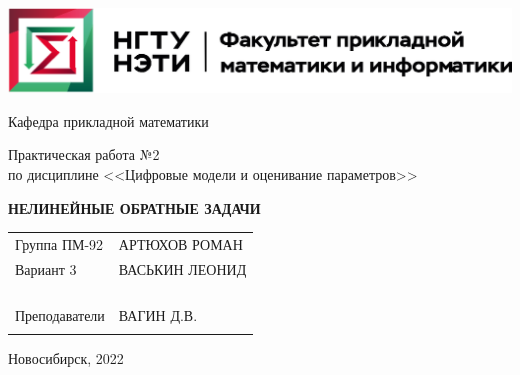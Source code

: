 \documentclass[12pt,a4paper]{article}
\begin{document}
\begin{center}
\begin{large}
\includegraphics[scale=0.8]{pic/logo_fami}
\vspace{14mm}

\begin{spacing}{0.9}
    Кафедра прикладной математики

    Практическая работа №2 \\ %
    по дисциплине <<Цифровые модели и оценивание параметров>> \\ %
    \bigskip
    \begin{normalsize}
        \textbf{НЕЛИНЕЙНЫЕ ОБРАТНЫЕ ЗАДАЧИ} %
    \end{normalsize}
\end{spacing}


\vspace{8mm}

\renewcommand{\arraystretch}{1.5}
\begin{normalsize}
\begin{spacing}{1}
    \begin{tabular}{ll}
        Группа ПМ-92			& АРТЮХОВ РОМАН \\
        Вариант 3			    & ВАСЬКИН ЛЕОНИД \\
        				      & \\
        					    & \\
    					        & \\
    					        & \\
        Преподаватели	        & ВАГИН Д.В.  \\
                                & \\
    \end{tabular}
\end{spacing}
\end{normalsize}
\renewcommand{\arraystretch}{1.0}

\vspace{10mm}
Новосибирск, 2022

\end{large}
\end{center}
\newpage
\end{document}
